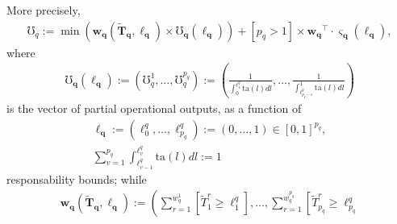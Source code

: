 \documentclass[hidelinks, nonatbib]{elsarticle}
\begin{document}
\begin{axiom}
\begin{subaxiom}
    More precisely,
    \begin{gather}
        \mho_q
        :=
        \min\left(
            \boldsymbol{w_{q}}(
                \boldsymbol{\tilde{T}_{q}}
                ,
                \boldsymbol{\ell_{q}}
            )
            \times
            \boldsymbol{\mho_{q}}(
                \boldsymbol{\ell_{q}}
            )
        \right)
        +
        [p_q > 1]
        \times
        \boldsymbol{w_{q}} ^ {\top}
        \cdot 
        \boldsymbol{\varsigma_{q}}(
            \boldsymbol{\ell_{q}}
        )
        ,
    \end{gather}
    where
    \begin{gather}
        \boldsymbol{\mho_{q}}(
            \boldsymbol{\ell_{q}}
        )
        :=
        \left(
            \mho_{q}^{1}
            ,
            \dots
            ,
            \mho_{q}^{p_q}
        \right)
        :=
        \left(
            \frac{1}{
                \int_{0}^{\ell_{1}^{q}}
                \text{ta}(l)dl
            }
            ,
            \dots
            ,
            \frac{1}{
                \int_{\ell_{p_q-1}^{q}}^{1}
                \text{ta}(l)dl
            }
        \right)
    \end{gather}
    is the vector of partial operational outputs, as a function of
    \begin{gather}
        \boldsymbol{\ell_q}
        :=
        \left(
            \ell_{0}^{q}
            ,
            \dots
            ,
            \ell_{p_q}^{q}
        \right)
        :=
        \left(
            0
            ,
            \dots
            ,
            1
        \right)
        \in
        [0,1] ^ {p_q}
        ,
        \\
        \sum_{v=1}^{p_q}{
            \int_{
                \ell_{v-1}^{q}
            }^{
                \ell_{v}^{q}
            }
            \text{ta}(l)dl
        }
        :=
        1
    \end{gather}
    responsability bounds; while
    \begin{gather}
        \boldsymbol{w_{q}}(
            \boldsymbol{\tilde{T}_{q}},
            \boldsymbol{\ell_{q}}
        )
        :=
        \left(
            \sum_{r=1}^{w_{q}^{1}}
            \left[
                \tilde{T}_{1}^{r}
                \geq
                \ell_{1}^{q}
            \right]
            ,
            \dots
            ,
            \sum_{r=1}^{w_{q}^{p_q}}
            \left[
                \tilde{T}_{p_q}^{r}
                \geq
                \ell_{p_q}^{q}

\end{gather}
\end{subaxiom}
\end{axiom}
\end{document}
